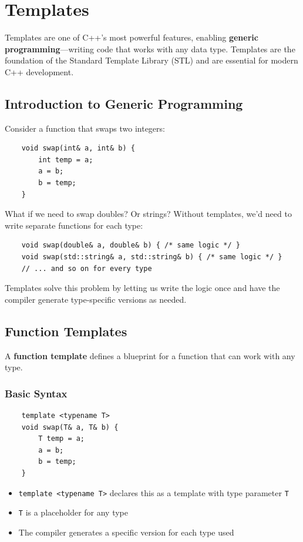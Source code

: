 \section{Templates}

Templates are one of C++'s most powerful features, enabling \textbf{generic programming}—writing code that works with any data type. Templates are the foundation of the Standard Template Library (STL) and are essential for modern C++ development.

\subsection{Introduction to Generic Programming}

Consider a function that swaps two integers:

\begin{lstlisting}
	void swap(int& a, int& b) {
		int temp = a;
		a = b;
		b = temp;
	}
\end{lstlisting}

What if we need to swap doubles? Or strings? Without templates, we'd need to write separate functions for each type:

\begin{lstlisting}
	void swap(double& a, double& b) { /* same logic */ }
	void swap(std::string& a, std::string& b) { /* same logic */ }
	// ... and so on for every type
\end{lstlisting}

Templates solve this problem by letting us write the logic once and have the compiler generate type-specific versions as needed.

\subsection{Function Templates}

A \textbf{function template} defines a blueprint for a function that can work with any type.

\subsubsection{Basic Syntax}

\begin{lstlisting}
	template <typename T>
	void swap(T& a, T& b) {
		T temp = a;
		a = b;
		b = temp;
	}
\end{lstlisting}

\begin{itemize}
	\item \texttt{template <typename T>} declares this as a template with type parameter \texttt{T}
	\item \texttt{T} is a placeholder for any type
	\item The compiler generates a specific version for each type used
\end{itemize}

